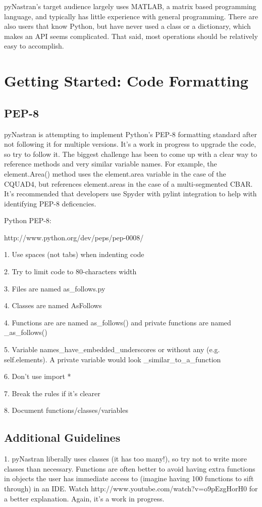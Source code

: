      pyNastran's target audience largely uses MATLAB, a matrix based programming language, and typically has little experience with general programming.  There are also users that know Python, but have never used a class or a dictionary, which makes an API seems complicated.  That said, most operations should be relatively easy to accomplish.


\section{Getting Started: Code Formatting}
 \subsection{PEP-8}
     pyNastran is attempting to implement Python's PEP-8 formatting standard after not following it for multiple versions.  It's a work in progress to upgrade the code, so try to follow it.  The biggest challenge has been to come up with a clear way to reference methods and very similar variable names.  For example, the element.Area() method uses the element.area variable in the case of the CQUAD4, but references element.areas in the case of a multi-segmented CBAR.  It's recommended that developers use Spyder with pylint integration to help with identifying PEP-8 deficencies.

    Python PEP-8:
     
     http://www.python.org/dev/peps/pep-0008/

     1.  Use spaces (not tabs) when indenting code

     2.  Try to limit code to 80-characters width

     3.  Files are named as\_follows.py

     4.  Classes are named AsFollows

     4.  Functions are are named as\_follows() and private functions are named \_as\_follows()

     5.  Variable names\_have\_embedded\_underscores or without any (e.g. self.elements).  A private variable would look \_similar\_to\_a\_function

     6.  Don't use import *

     7.  Break the rules if it's clearer

     8.  Document functions/classes/variables

 \subsection{Additional Guidelines}
     1.  pyNastran liberally uses classes (it has too many!), so try not to write more classes than necessary.  Functions are often better to avoid having extra functions in objects the user has immediate access to (imagine having 100 functions to sift through) in an IDE.  Watch http://www.youtube.com/watch?v=o9pEzgHorH0 for a better explanation.  Again, it's a work in progress.

